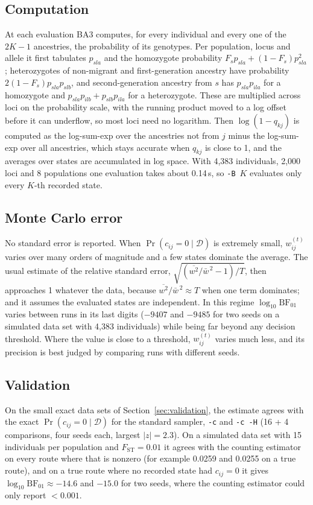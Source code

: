 \documentclass[11pt,a4paper]{article}
\newcommand{\BF}{\mathrm{BF}}
\newcommand{\data}{\mathcal{D}}
\newcommand{\1}{\mathbf{1}}
\begin{document}
\subsection{Computation}

At each evaluation BA3 computes, for every individual and every one of the
$2K-1$ ancestries, the probability of its genotypes. Per population, locus and
allele it first tabulates $p_{sla}$ and the homozygote probability
$F_sp_{sla}+(1-F_s)p_{sla}^2$; heterozygotes of non-migrant and first-generation
ancestry have probability $2(1-F_s)p_{sla}p_{slb}$, and second-generation
ancestry from $s$ has $p_{sla}p_{ila}$ for a homozygote and
$p_{sla}p_{ilb}+p_{slb}p_{ila}$ for a heterozygote. These are multiplied across
loci on the probability scale, with the running product moved to a log offset
before it can underflow, so most loci need no logarithm. Then
$\log(1-q_{kj})$ is computed as the log-sum-exp over the ancestries not from $j$
minus the log-sum-exp over all ancestries, which stays accurate when $q_{kj}$ is
close to 1, and the averages over states are accumulated in log space. With
4,383 individuals, 2,000 loci and 8 populations one evaluation takes about
0.14\,s, so \texttt{-B}~$K$ evaluates only every $K$-th recorded state.

\subsection{Monte Carlo error}

No standard error is reported. When $\Pr(c_{ij}=0\mid\data)$ is extremely small,
$w^{(t)}_{ij}$ varies over many orders of magnitude and a few states dominate the
average. The usual estimate of the relative standard error,
$\sqrt{(\overline{w^2}/\bar w^{\,2}-1)/T}$, then approaches 1 whatever the data,
because $\overline{w^2}/\bar w^{\,2}\approx T$ when one term dominates; and it
assumes the evaluated states are independent. In this regime $\log_{10}\BF_{01}$
varies between runs in its last digits ($-9407$ and $-9485$ for two seeds on a
simulated data set with 4,383 individuals) while being far beyond any decision
threshold. Where the value is close to a threshold, $w^{(t)}_{ij}$ varies much
less, and its precision is best judged by comparing runs with different seeds.

\subsection{Validation}

On the small exact data sets of Section~\ref{sec:validation}, the estimate agrees
with the exact $\Pr(c_{ij}=0\mid\data)$ for the standard sampler, \texttt{-c}
and \texttt{-c -H} (16 + 4 comparisons, four seeds each, largest $|z|=2.3$). On a
simulated data set with 15 individuals per population and $F_{\mathrm{ST}}=0.01$
it agrees with the counting estimator on every route where that is nonzero (for
example 0.0259 and 0.0255 on a true route), and on a true route where no
recorded state had $c_{ij}=0$ it gives $\log_{10}\BF_{01}\approx -14.6$ and
$-15.0$ for two seeds, where the counting estimator could only report
$<0.001$.
\end{document}
